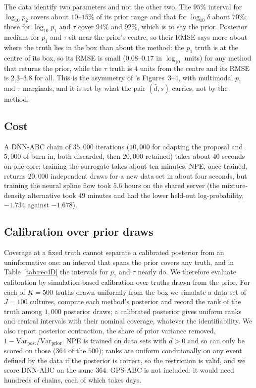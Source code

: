 \documentclass[sn-basic,iicol,pdflatex]{sn-jnl}
\begin{document}
The data identify two parameters and not the other two. The $95\%$ interval for $\log_{10}p_2$ covers
about $10$--$15\%$ of its prior range and that for $\log_{10}\delta$ about $70\%$; those for $\log_{10}p_1$
and $\tau$ cover $94\%$ and $92\%$, which is to say the prior. Posterior medians
for $p_1$ and $\tau$ sit near the prior's centre, so their RMSE says more about where the truth
lies in the box than about the method: the $p_1$ truth is at the centre of its box, so its RMSE is
small ($0.08$--$0.17$ in $\log_{10}$ units) for any method that returns the prior, while the $\tau$ truth
is $4$ units from the centre and its RMSE is $2.3$--$3.8$ for all. This is the
asymmetry of \citeauthor{lu2023}'s Figures~3--4, with multimodal $p_1$ and $\tau$ marginals, and it
is set by what the pair $(\bar d,s)$ carries, not by the method.

\subsection{Cost}
\label{sec:cost}

A DNN-ABC chain of $35{,}000$ iterations ($10{,}000$ for adapting the proposal \citep{haario2001} and $5{,}000$ of burn-in, both discarded, then
$20{,}000$ retained) takes about $40$ seconds on one core; training the surrogate
takes about ten minutes. NPE, once trained, returns $20{,}000$ independent draws for a new data set in about four
seconds, but training the neural spline flow took $5.6$ hours on the shared server
(the mixture-density alternative took $49$ minutes and had the lower held-out log-probability, $-1.734$ against $-1.678$).

\subsection{Calibration over prior draws}
\label{sec:sim3D_sbc}

Coverage at a fixed truth cannot separate a calibrated posterior from an uninformative one: an
interval that spans the prior covers any truth, and in Table~\ref{tab:rec4D} the intervals for $p_1$
and $\tau$ nearly do. We therefore evaluate calibration by simulation-based calibration \citep{cook2006,talts2018,modrak2025}
over truths drawn from the prior. For each of $K=500$ truths drawn uniformly from the box we simulate a data set of
$J=100$ cultures, compute each method's posterior and record the rank of the truth among $1{,}000$ posterior
draws; a calibrated posterior gives uniform ranks and central intervals with their nominal coverage,
whatever the identifiability. We also report posterior contraction, the share of prior
variance removed, $1-\overline{\mathrm{Var}}_{\mathrm{post}}/\mathrm{Var}_{\mathrm{prior}}$.
NPE is trained on data sets with $\bar d>0$ and so can only be scored on those ($364$ of the $500$);
ranks are uniform conditionally on any event defined by the data if the posterior is correct, so the
restriction is valid, and we score DNN-ABC on the same $364$. GPS-ABC is not included: it would need
hundreds of chains, each of which takes days.
\end{document}
